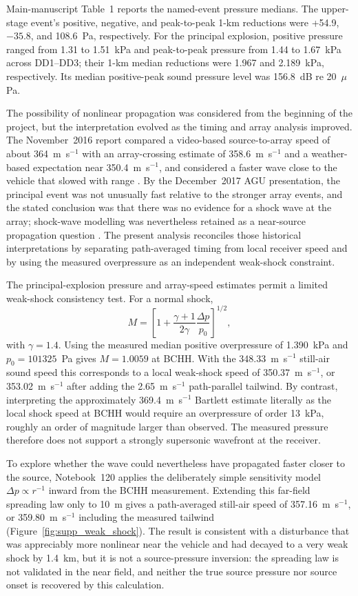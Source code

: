 \documentclass[]{seismica}
\begin{document}
Main-manuscript Table~1 reports the named-event pressure medians. The
upper-stage event's positive, negative, and peak-to-peak 1-km reductions were
+54.9, $-35.8$, and 108.6~Pa, respectively. For the principal explosion,
positive pressure ranged from 1.31 to 1.51~kPa and peak-to-peak pressure from
1.44 to 1.67~kPa across DD1--DD3; their 1-km median reductions were 1.967 and
2.189~kPa, respectively. Its median positive-peak sound pressure level was
156.8~dB re 20~$\mu$Pa.

The possibility of nonlinear propagation was considered from the beginning
of the project, but the interpretation evolved as the timing and array
analysis improved. The November~2016 report compared a video-based
source-to-array speed of about 364~m~s$^{-1}$ with an array-crossing estimate
of 358.6~m~s$^{-1}$ and a weather-based expectation near 350.4~m~s$^{-1}$,
and considered a faster wave close to the vehicle that slowed with range
\citep{thompson_mcnutt_fireball_2016}. By the December~2017 AGU presentation,
the principal event was not unusually fast relative to the stronger array
events, and the stated conclusion was that there was no evidence for a shock
wave at the array; shock-wave modelling was nevertheless retained as a
near-source propagation question \citep{thompson_agu_falcon9_2017}. The
present analysis reconciles those historical interpretations by separating
path-averaged timing from local receiver speed and by using the measured
overpressure as an independent weak-shock constraint.

The principal-explosion pressure and array-speed estimates permit a limited
weak-shock consistency test. For a normal shock,
\begin{equation}
 M=\left[1+\frac{\gamma+1}{2\gamma}\frac{\Delta p}{p_0}\right]^{1/2},
\end{equation}
with $\gamma=1.4$. Using the measured median positive overpressure of
1.390~kPa and $p_0=101325$~Pa gives $M=1.0059$ at BCHH. With the
348.33~m~s$^{-1}$ still-air sound speed this corresponds to a local weak-shock
speed of 350.37~m~s$^{-1}$, or 353.02~m~s$^{-1}$ after adding the
2.65~m~s$^{-1}$ path-parallel tailwind. By contrast, interpreting the
approximately 369.4~m~s$^{-1}$ Bartlett estimate literally as the local shock
speed at BCHH would require an overpressure of order 13~kPa, roughly an order
of magnitude larger than observed. The measured pressure therefore does not
support a strongly supersonic wavefront at the receiver.

To explore whether the wave could nevertheless have propagated faster closer
to the source, Notebook~120 applies the deliberately simple sensitivity model
$\Delta p\propto r^{-1}$ inward from the BCHH measurement. Extending this
far-field spreading law only to 10~m gives a path-averaged still-air speed of
357.16~m~s$^{-1}$, or 359.80~m~s$^{-1}$ including the measured tailwind
(Figure~\ref{fig:supp_weak_shock}). The result is consistent with a disturbance
that was appreciably more nonlinear near the vehicle and had decayed to a very
weak shock by 1.4~km, but it is not a source-pressure inversion: the spreading
law is not validated in the near field, and neither the true source pressure
nor source onset is recovered by this calculation.
\end{document}
